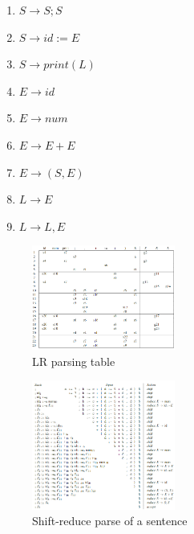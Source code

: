 \quad

\quad

\quad

\begin{example}\quad
    
    \begin{enumerate}
        \item $S\to S;S$
        \item $S\to id:=E$
        \item $S\to print(L)$
        \item $E\to id$
        \item $E\to num$
        \item $E\to E+E$
        \item $E\to (S,E)$
        \item $L\to E$
        \item $L\to L, E$
    \end{enumerate}

    \begin{figure}[H]
        \centering
        \includegraphics[width=0.42\textwidth]{pic/CP3/lrtable.png}
        \caption{LR parsing table}
    \end{figure}
    
\begin{figure}[H]
    \centering
    \includegraphics[width=0.42\textwidth]{pic/CP3/Shift-reduce parse of a sentence}
    \caption{Shift-reduce parse of a sentence}
    \label{fig:explruse}
\end{figure}


\end{example}

